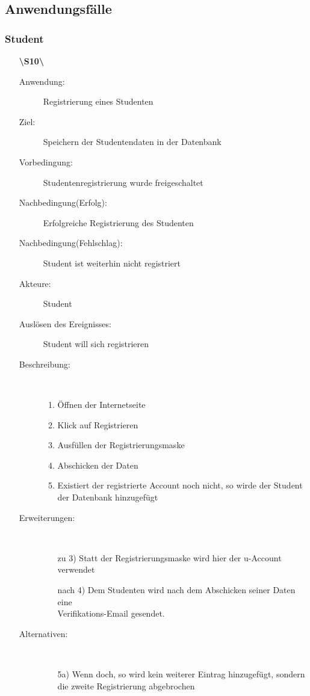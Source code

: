 \documentclass[parskip=full]{scrartcl}
\begin{document}
\subsection{Anwendungsfälle}

\subsubsection{Student}

\begin{enumerate}
  \item[\textbf{\textbackslash S10\textbackslash}] \begin{description}
  	\item[Anwendung:] Registrierung eines Studenten
  	\item[Ziel:] Speichern der Studentendaten in der Datenbank
  	\item[Vorbedingung:] Studentenregistrierung wurde freigeschaltet
  	\item[Nachbedingung(Erfolg):] Erfolgreiche Registrierung des Studenten
  	\item[Nachbedingung(Fehlschlag):] Student ist weiterhin nicht registriert
  	\item[Akteure:] Student
  	\item[Auslösen des Ereignisses:] Student will sich registrieren
  	\item[Beschreibung:]~
  	\begin{enumerate}[1.]
  	  \item Öffnen der Internetseite
      \item Klick auf Registrieren
      \item Ausfüllen der Registrierungsmaske
      \item Abschicken der Daten
      \item Existiert der registrierte Account noch nicht, so wirde der Student
      der Datenbank hinzugefügt
  	\end{enumerate}
  	\item[Erweiterungen:]~
  	\begin{enumerate}
  	  \item[zu 3)] Statt der Registrierungsmaske wird hier der u-Account
  	  verwendet
  	  \item[nach 4)] Dem Studenten wird nach dem Abschicken seiner Daten eine \\
  	  Verifikations-Email gesendet.
  	 \end{enumerate} 
  	\item[Alternativen:]~
  	\begin{enumerate}
  	  \item[5a)] Wenn doch, so wird kein weiterer Eintrag hinzugefügt, sondern
  	  die zweite Registrierung abgebrochen
  	\end{enumerate} 
  \end{description}
  

\end{enumerate}
\end{document}
